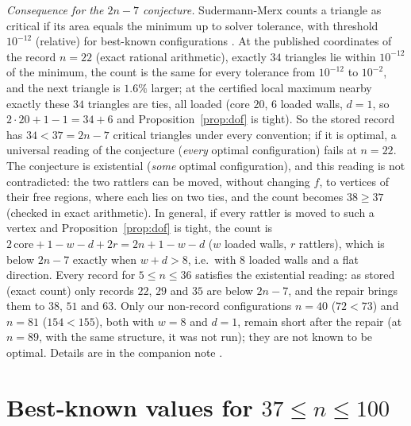 \documentclass[11pt]{amsart}
\theoremstyle{definition}
\newcommand{\core}{\mathrm{core}}
\begin{document}
\emph{Consequence for the $2n-7$ conjecture.} Sudermann-Merx counts a triangle as critical if its area equals the minimum up to solver tolerance, with threshold $10^{-12}$ (relative) for best-known configurations \cite[Sec.~7]{SM}. At the published coordinates of the record $n = 22$ (exact rational arithmetic), exactly $34$ triangles lie within $10^{-12}$ of the minimum, the count is the same for every tolerance from $10^{-12}$ to $10^{-2}$, and the next triangle is $1.6\%$ larger; at the certified local maximum nearby exactly these $34$ triangles are ties, all loaded (core $20$, $6$ loaded walls, $d = 1$, so $2\cdot20+1-1 = 34 + 6$ and Proposition~\ref{prop:dof} is tight). So the stored record has $34 < 37 = 2n-7$ critical triangles under every convention; if it is optimal, a universal reading of the conjecture (\emph{every} optimal configuration) fails at $n = 22$. The conjecture is existential (\emph{some} optimal configuration), and this reading is not contradicted: the two rattlers can be moved, without changing $f$, to vertices of their free regions, where each lies on two ties, and the count becomes $38 \ge 37$ (checked in exact arithmetic). In general, if every rattler is moved to such a vertex and Proposition~\ref{prop:dof} is tight, the count is $2\,\core + 1 - w - d + 2r = 2n + 1 - w - d$ ($w$ loaded walls, $r$ rattlers), which is below $2n-7$ exactly when $w + d > 8$, i.e.\ with $8$ loaded walls and a flat direction. Every record for $5 \le n \le 36$ satisfies the existential reading: as stored (exact count) only records $22$, $29$ and $35$ are below $2n-7$, and the repair brings them to $38$, $51$ and $63$. Only our non-record configurations $n = 40$ ($72 < 73$) and $n = 81$ ($154 < 155$), both with $w = 8$ and $d = 1$, remain short after the repair (at $n = 89$, with the same structure, it was not run); they are not known to be optimal. Details are in the companion note \cite{Note2}. %

\section{Best-known values for \texorpdfstring{$37 \le n \le 100$}{37 <= n <= 100}}\label{sec:results}
\end{document}
